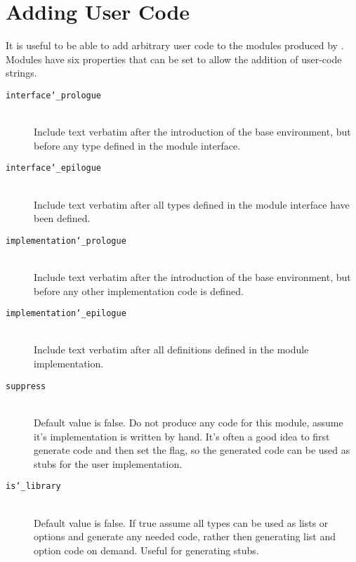 \section{Adding User Code}
It is useful to be able to add arbitrary user code to the modules
produced by \asdlgen{}.
Modules have six properties that can be set to allow
the addition of user-code strings. 
\begin{description}
  \item[\texttt{interface\char`\_prologue}]\mbox{}\\
    Include text verbatim after the introduction of the base
    environment, but before any type defined in the module interface.

  \item[\texttt{interface\char`\_epilogue}]\mbox{}\\
    Include text verbatim after all types defined in the module
    interface have been defined.
	
  \item[\texttt{implementation\char`\_prologue}]\mbox{}\\
    Include text verbatim after the introduction of the base
    environment, but before any other implementation code is defined.
	
  \item[\texttt{implementation\char`\_epilogue}]\mbox{}\\
   Include text verbatim after all definitions defined in the module
   implementation.  

  \item[\texttt{suppress}]\mbox{}\\
   Default value is false. Do not produce any code for this module, 
   assume it's implementation is 
   written by hand. It's often a good idea to first generate code and then
   set the flag, so the generated code can be used as stubs for the 
   user implementation.

  \item[\texttt{is\char`\_library}]\mbox{}\\
   Default value is false. If true assume all types can be used
   as lists or options and generate any needed code, rather then 
   generating list and option code on demand. Useful for generating stubs.

\end{description}%

